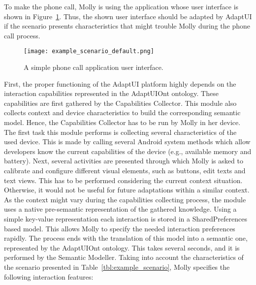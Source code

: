 
To make the phone call, Molly is using the application whose user interface is
shown in Figure~\ref{fig:example_scenario_default}. Thus, the shown user interface
should be adapted by AdaptUI if the scenario presents characteristics that might
trouble Molly during the phone call process.

\begin{figure}[H]
\centering
\texttt{[image: example\_scenario\_default.png]}
\caption{A simple phone call application user interface.}
\label{fig:example_scenario_default}
\end{figure}

First, the proper functioning of the AdaptUI platform highly depends on the
interaction capabilities represented in the AdaptUIOnt ontology. These capabilities
are first gathered by the Capabilities Collector. This module also collects context
and device characteristics to build the corresponding semantic model. Hence,
the Capabilities Collector has to be run by Molly in her device. The first task
this module performs is collecting several characteristics of the used device.
This is made by calling several Android system methods which allow developers
know the current capabilities of the device (e.g., available memory and battery).
Next, several activities are presented through which Molly is asked to calibrate
and configure different visual elements, such as buttons, edit texts and text
views. This has to be performed considering the current context situation. 
Otherwise, it would not be useful for future adaptations within a similar context. 
As the context might vary during the capabilities collecting process, the module
uses a native pre-semantic representation of the gathered knowledge. Using a simple
key-value representation each interaction is stored in a SharedPreferences based
model. This allows Molly to specify the needed interaction preferences rapidly.
The process ends with the translation of this model into a semantic one, represented
by the AdaptUIOnt ontology. This takes several seconds, and it is performed by
the Semantic Modeller. Taking into account the characteristics of the scenario 
presented in Table~\ref{tbl:example_scenario}, Molly specifies the following
interaction features:
% 


